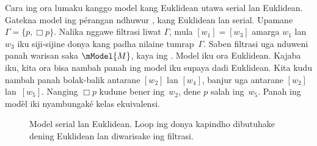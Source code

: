 \documentclass[../../../include/open-logic-section]{subfiles}
\begin{document}


Cara ing  ora lumaku kanggo model kang Euklidean
utawa serial lan Euklidean. Gatekna model ing pérangan ndhuwur
, kang Euklidean lan serial. Upamane
$\Gamma = \{p, \Box p \}$. Nalika nggawe filtrasi liwat $\Gamma$,
mula $[w_1] = [w_3]$ amarga $w_1$ lan $w_3$ iku siji-sijine donya
kang padha nilaine tumrap~$\Gamma$. Saben filtrasi uga nduweni panah
warisan saka $\mModel{M}$, kaya ing . Model iku
ora Euklidean. Kajaba iku, kita ora bisa nambah panah ing model iku
supaya dadi Euklidean. Kita kudu nambah panah bolak-balik antarane
$[w_2]$ lan $[w_4]$, banjur uga antarane $[w_2]$ lan~$[w_5]$. Nanging $\Box
p$ kudune bener ing~$w_2$, dene $p$ salah ing~$w_5$. Panah ing modèl iki nyambungaké kelas ekuivalensi.

\begin{figure}[htpb]
  \centering
  \caption{Model serial lan Euklidean. Loop ing donya kapindho dibutuhake dening Euklidean lan diwarisake ing filtrasi.}
\end{figure}
\end{document}
